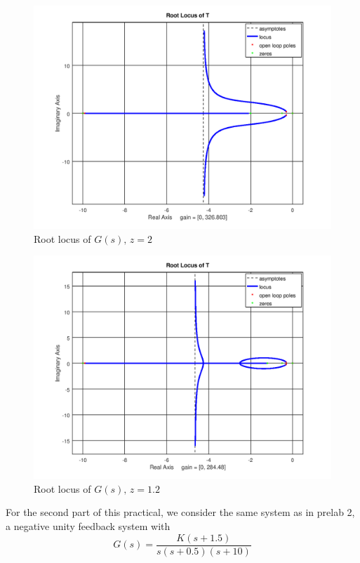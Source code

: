 \documentclass[12pt, a4paper]{article}
\begin{document}
		\begin{figure}[H]
			\centering
			\includegraphics[width=.8\textwidth]{img/rlocus_2.png}
			\caption{Root locus of $G(s),\,z=2$}
			\label{fig:fig_2}
		\end{figure}

		\begin{figure}[H]
			\centering
			\includegraphics[width=.8\textwidth]{img/rlocus_3.png}
			\caption{Root locus of $G(s),\,z=1.2$}
			\label{fig:fig_3}
		\end{figure}

		For the second part of this practical, we consider the same system as in prelab 2, a negative unity feedback system with
		\begin{equation}
			G(s) = \frac{K(s+1.5)}{s(s+0.5)(s+10)}
			\label{eq:lab_2}
		\end{equation}
\end{document}
